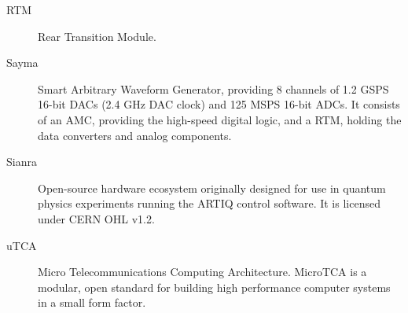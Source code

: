 \begin{description}
	\item[RTM] Rear Transition Module.
	\item[Sayma] Smart Arbitrary Waveform Generator, providing 8 channels of 1.2 GSPS 16-bit DACs (2.4 GHz DAC clock) and 125 MSPS 16-bit ADCs. It consists of an AMC, providing the high-speed digital logic, and a RTM, holding the data converters and analog components.
	\item[Sianra] Open-source hardware ecosystem originally designed for use in quantum physics experiments running the ARTIQ control software. It is licensed under CERN OHL v1.2.
	\item[uTCA] Micro Telecommunications Computing Architecture. MicroTCA is a modular, open standard for building high performance computer systems in a small form factor.
\end{description}


